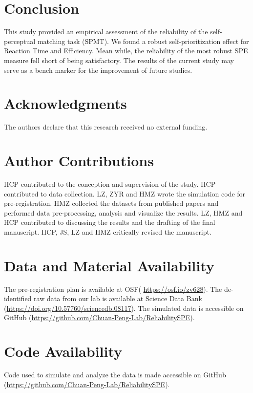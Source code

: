 \documentclass[sn-apa]{sn-jnl}%
\theoremstyle{thmstyleone}%
\theoremstyle{thmstyletwo}%
\theoremstyle{thmstylethree}%
\begin{document}
\section{Conclusion}\label{sec13}

This study provided an empirical assessment of the reliability of the self-perceptual matching task (SPMT). We found a robust self-prioritization effect for Reaction Time and Efficiency. Mean while, the reliability of the most robust SPE measure fell short of being satisfactory. The results of the current study may serve as a bench marker for the improvement of future studies.

\section*{Acknowledgments}

The authors declare that this research received no external funding.

\section*{Author Contributions}

HCP contributed to the conception and supervision of the study. HCP contributed to data collection. LZ, ZYR and HMZ wrote the simulation code for pre-registration. HMZ collected the datasets from published papers and performed data pre-processing, analysis and visualize the results. LZ, HMZ and HCP contributed to discussing the results and the drafting of the final manuscript. HCP, JS, LZ and HMZ critically revised the manuscript.

\section*{Data and Material Availability}

The pre-registration plan is available at OSF( \url{https://osf.io/zv628}). The de-identified raw data from our lab is available at Science Data Bank (\url{https://doi.org/10.57760/sciencedb.08117}). The simulated data is accessible on GitHub (\url{https://github.com/Chuan-Peng-Lab/ReliabilitySPE}). 

\section*{Code Availability}

Code used to simulate and analyze the data is made accessible on GitHub (\url{https://github.com/Chuan-Peng-Lab/ReliabilitySPE}). 
\end{document}

